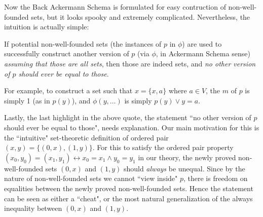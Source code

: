 \documentclass{article}
\begin{document}
Now the Back Ackermann Schema is formulated for easy contruction of non-well-founded sets, but it looks spooky and extremely complicated. Nevertheless, the intuition is actually simple:

\begin{displayquote}
If potential non-well-founded sets (the instances of $p$ in $\phi$) are used to successfully construct another version of $p$ (via $\phi$, in Ackermann Schema sense) \textit{assuming that those are all sets}, then those are indeed sets, and \textit{no other version of $p$ should ever be equal to those}.
\end{displayquote}

For example, to construct a set such that $x=\{x, a\}$ where $a \in V$, the $m$ of $p$ is simply 1 (as in $p(y)$), and $\phi(y, \ldots)$ is simply $p(y) \vee y = a$.

Lastly, the last highlight in the above quote, the statement ``no other version of $p$ should ever be equal to those", needs explanation. Our main motivation for this is the ``intuitive" set-theoretic definition of ordered pair $(x,y) = \{(0,x), (1, y)\}$. For this to satisfy the ordered pair property $(x_0,y_0) = (x_1, y_1) \leftrightarrow x_0 = x_1 \wedge y_0 = y_1$ in our theory, the newly proved non-well-founded sets $(0,x)$ and $(1,y)$ should \textit{always} be unequal. Since by the nature of non-well-founded sets we cannot ``view inside" $p$, there is freedom on equalities between the newly proved non-well-founded sets. Hence the statement can be seen as either a ``cheat", or the most natural generalization of the always inequality between $(0,x)$ and $(1,y)$.



\end{document}
